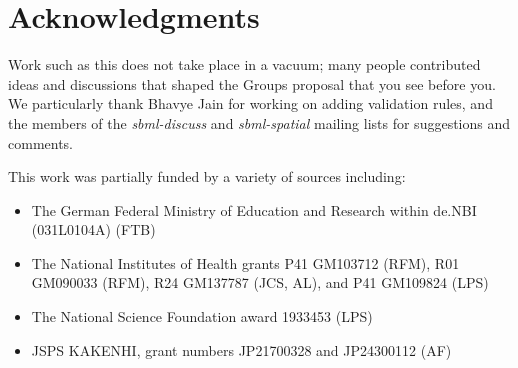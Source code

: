 
\section{Acknowledgments}

Work such as this does not take place in a vacuum; many people contributed ideas and discussions that shaped the Groups proposal that you see before you.  We particularly thank Bhavye Jain for working on adding validation rules, and the members of the \emph{sbml-discuss} and \emph{sbml-spatial} mailing lists for suggestions and comments.

This work was partially funded by a variety of sources including:
\begin{itemize}
  \item The German Federal Ministry of Education and Research within de.NBI (031L0104A) (FTB)
  \item The National Institutes of Health grants P41 GM103712 (RFM), R01 GM090033 (RFM), R24 GM137787 (JCS, AL), and P41 GM109824 (LPS)
  \item The National Science Foundation award 1933453 (LPS)
  \item JSPS KAKENHI, grant numbers JP21700328 and JP24300112 (AF)
\end{itemize}
